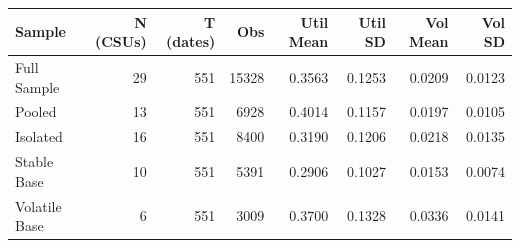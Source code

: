\begin{tabular}{lrrrrrrr}
\toprule
Sample & N (CSUs) & T (dates) & Obs & Util Mean & Util SD & Vol Mean & Vol SD \\
\midrule
Full Sample & 29 & 551 & 15328 & 0.3563 & 0.1253 & 0.0209 & 0.0123 \\
Pooled & 13 & 551 & 6928 & 0.4014 & 0.1157 & 0.0197 & 0.0105 \\
Isolated & 16 & 551 & 8400 & 0.3190 & 0.1206 & 0.0218 & 0.0135 \\
Stable Base & 10 & 551 & 5391 & 0.2906 & 0.1027 & 0.0153 & 0.0074 \\
Volatile Base & 6 & 551 & 3009 & 0.3700 & 0.1328 & 0.0336 & 0.0141 \\
\bottomrule
\end{tabular}
